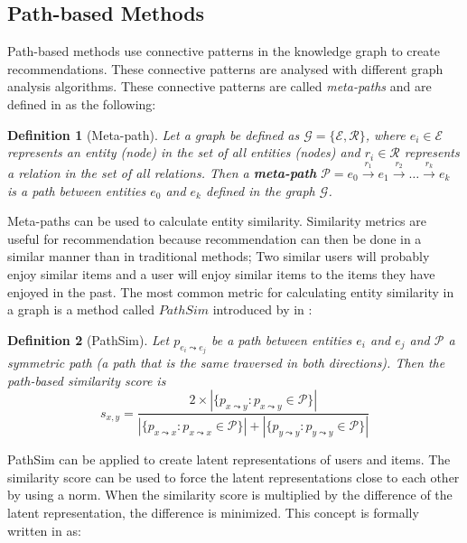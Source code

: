 \documentclass[english, 12pt, a4paper, sci, utf8, a-2b, online]{aaltothesis}
\newtheorem{definition}{Definition}[section]
\begin{document}


\subsection{Path-based Methods}
\label{subsec:path_based_methods}

Path-based methods use connective patterns in the knowledge graph to create recommendations. These connective patterns are analysed with different graph analysis algorithms. These connective patterns are called \textit{meta-paths} and are defined in \parencite{guo2020survey} as the following:

\begin{definition}[Meta-path]
\label{def:meta_path}
    Let a graph be defined as $\mathcal{G} = \{\mathcal{E}, \mathcal{R}\}$, where $e_i \in \mathcal{E}$ represents an entity (node) in the set of all entities (nodes) and $r_i \in \mathcal{R}$ represents a relation in the set of all relations. Then a \textbf{meta-path} $\mathcal{P} = e_0 \xrightarrow{r_1} e_1 \xrightarrow{r_2} \ldots \xrightarrow{r_k} e_k$ is a path between entities $e_0$ and $e_k$ defined in the graph $\mathcal{G}$.
\end{definition}

Meta-paths can be used to calculate entity similarity. Similarity metrics are useful for recommendation because recommendation can then be done in a similar manner than in traditional methods; Two similar users will probably enjoy similar items and a user will enjoy similar items to the items they have enjoyed in the past. The most common metric for calculating entity similarity in a graph is a method called $PathSim$ introduced by \textcite{sun2011pathsim} in \citeyear{sun2011pathsim}:

\begin{definition}[PathSim]
\label{def:pathsim}
    Let $p_{e_i \leadsto e_j}$ be a path between entities $e_i$ and $e_j$ and $\mathcal{P}$ a symmetric path (a path that is the same traversed in both directions). Then the path-based similarity score is
    \[
        s_{x,y} = \frac{2 \times |\{p_{x \leadsto y} : p_{x \leadsto y} \in \mathcal{P}\}|}{|\{p_{x \leadsto x} : p_{x \leadsto x} \in \mathcal{P}\}| + |\{p_{y \leadsto y} : p_{y \leadsto y} \in \mathcal{P}\}|}
    \]
\end{definition}

PathSim can be applied to create latent representations of users and items. The similarity score can be used to force the latent representations close to each other by using a norm. When the similarity score is multiplied by the difference of the latent representation, the difference is minimized. This concept is formally written in \parencite{guo2020survey} as:
\end{document}

